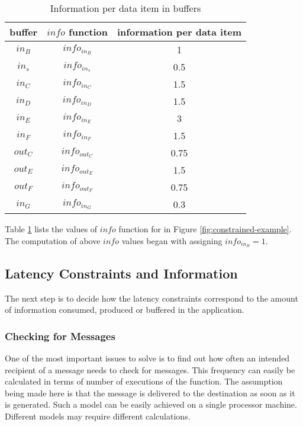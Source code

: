 
\begin{table}
\centering
\begin{tabular}{|c|c|c|}
\hline buffer & $info$ function & information per data item \\
\hline ${in_B}$ & $info_{in_B}$ & 1 \\
\hline ${in_s}$ & $info_{in_s}$ & 0.5 \\
\hline ${in_C}$ & $info_{in_C}$ & 1.5 \\
\hline ${in_D}$ & $info_{in_D}$ & 1.5 \\
\hline ${in_E}$ & $info_{in_E}$ & 3 \\
\hline ${in_F}$ & $info_{in_F}$ & 1.5 \\
\hline ${out_C}$ & $info_{out_C}$ & 0.75 \\
\hline ${out_E}$ & $info_{out_E}$ & 1.5 \\
\hline ${out_F}$ & $info_{out_F}$ & 0.75 \\
\hline ${in_G}$ & $info_{in_G}$ & 0.3 \\
\hline
\end{tabular}
\caption{Information per data item in
buffers}\label{tbl:constrained-info-buffer}
\end{table}

Table \ref{tbl:constrained-info-buffer} lists the values of $info$
function for {\Channels} in Figure \ref{fig:constrained-example}.
The computation of above $info$ values began with assigning
$info_{in_B} = 1$.

\subsection{Latency Constraints and Information}
\label{sec:constrained:constraints}

The next step is to decide how the latency constraints correspond
to the amount of information consumed, produced or buffered in the
application.

\subsubsection{Checking for Messages}

One of the most important issues to solve is to find out how often
an intended recipient of a message needs to check for messages.
This frequency can easily be calculated in terms of number of
executions of the {\work} function.  The assumption being made here
is that the message is delivered to the destination as soon as it
is generated.  Such a model can be easily achieved on a single
processor machine.  Different models may require different
calculations.

